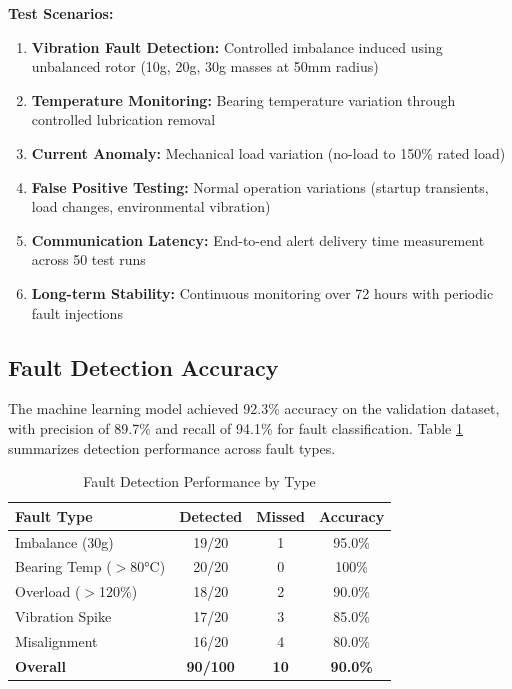 \documentclass[conference]{IEEEtran}
\begin{document}
\textbf{Test Scenarios:}
\begin{enumerate}
\item \textbf{Vibration Fault Detection:} Controlled imbalance induced using unbalanced rotor (10g, 20g, 30g masses at 50mm radius)
\item \textbf{Temperature Monitoring:} Bearing temperature variation through controlled lubrication removal
\item \textbf{Current Anomaly:} Mechanical load variation (no-load to 150\% rated load)
\item \textbf{False Positive Testing:} Normal operation variations (startup transients, load changes, environmental vibration)
\item \textbf{Communication Latency:} End-to-end alert delivery time measurement across 50 test runs
\item \textbf{Long-term Stability:} Continuous monitoring over 72 hours with periodic fault injections
\end{enumerate}

\subsection{Fault Detection Accuracy}

The machine learning model achieved 92.3\% accuracy on the validation dataset, with precision of 89.7\% and recall of 94.1\% for fault classification. Table \ref{tab:detection} summarizes detection performance across fault types.

\begin{table}[htbp]
\caption{Fault Detection Performance by Type}
\begin{center}
\begin{tabular}{|l|c|c|c|}
\hline
\textbf{Fault Type} & \textbf{Detected} & \textbf{Missed} & \textbf{Accuracy} \\
\hline
Imbalance (30g) & 19/20 & 1 & 95.0\% \\
Bearing Temp ($>$80°C) & 20/20 & 0 & 100\% \\
Overload ($>$120\%) & 18/20 & 2 & 90.0\% \\
Vibration Spike & 17/20 & 3 & 85.0\% \\
Misalignment & 16/20 & 4 & 80.0\% \\
\hline
\textbf{Overall} & \textbf{90/100} & \textbf{10} & \textbf{90.0\%} \\
\hline
\end{tabular}
\label{tab:detection}
\end{center}
\end{table}
\end{document}
